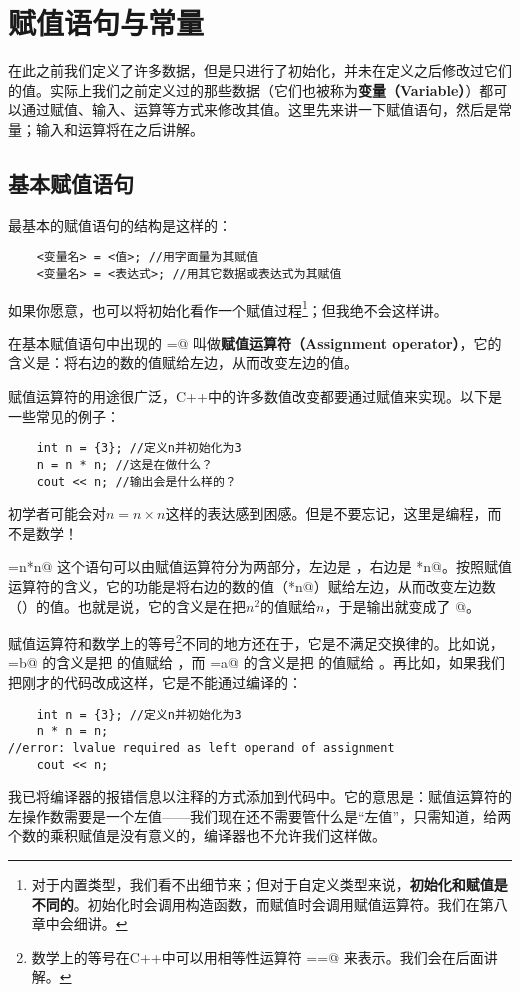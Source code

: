 \section{赋值语句与常量}
在此之前我们定义了许多数据，但是只进行了初始化，并未在定义之后修改过它们的值。实际上我们之前定义过的那些数据（它们也被称为\textbf{变量（Variable）}）都可以通过赋值、输入、运算等方式来修改其值。这里先来讲一下赋值语句，然后是常量；输入和运算将在之后讲解。\par
\subsection*{基本赋值语句}
最基本的赋值语句的结构是这样的：
\begin{lstlisting}
    <变量名> = <值>; //用字面量为其赋值
    <变量名> = <表达式>; //用其它数据或表达式为其赋值
\end{lstlisting}
如果你愿意，也可以将初始化看作一个赋值过程\footnote{对于内置类型，我们看不出细节来；但对于自定义类型来说，\textbf{初始化和赋值是不同的}。初始化时会调用构造函数，而赋值时会调用赋值运算符。我们在第八章中会细讲。}；但我绝不会这样讲。\par
在基本赋值语句中出现的 \lstinline@=@ 叫做\textbf{赋值运算符（Assignment operator）}，它的含义是：将右边的数的值赋给左边，从而改变左边的值。\par
赋值运算符的用途很广泛，C++中的许多数值改变都要通过赋值来实现。以下是一些常见的例子：
\begin{lstlisting}
    int n = {3}; //定义n并初始化为3
    n = n * n; //这是在做什么？
    cout << n; //输出会是什么样的？
\end{lstlisting}
初学者可能会对$n=n\times n$这样的表达感到困感。但是不要忘记，这里是编程，而不是数学！\par
\lstinline@n=n*n@ 这个语句可以由赋值运算符分为两部分，左边是 \lstinline@n@，右边是 \lstinline@n*n@。按照赋值运算符的含义，它的功能是将右边的数的值（\lstinline@n*n@）赋给左边，从而改变左边数（\lstinline@n@）的值。也就是说，它的含义是在把$n^2$的值赋给$n$，于是输出就变成了 @。\par
赋值运算符和数学上的等号\footnote{数学上的等号在C++中可以用相等性运算符 \lstinline@==@ 来表示。我们会在后面讲解。}不同的地方还在于，它是不满足交换律的。比如说，\lstinline@a=b@ 的含义是把 \lstinline@b@ 的值赋给 \lstinline@a@，而 \lstinline@b=a@ 的含义是把 \lstinline@a@ 的值赋给 \lstinline@b@。再比如，如果我们把刚才的代码改成这样，它是不能通过编译的：
\begin{lstlisting}
    int n = {3}; //定义n并初始化为3
    n * n = n;
//error: lvalue required as left operand of assignment
    cout << n;
\end{lstlisting}
我已将编译器的报错信息以注释的方式添加到代码中。它的意思是：赋值运算符的左操作数需要是一个左值——我们现在还不需要管什么是``左值''，只需知道，给两个数的乘积赋值是没有意义的，编译器也不允许我们这样做。\par
